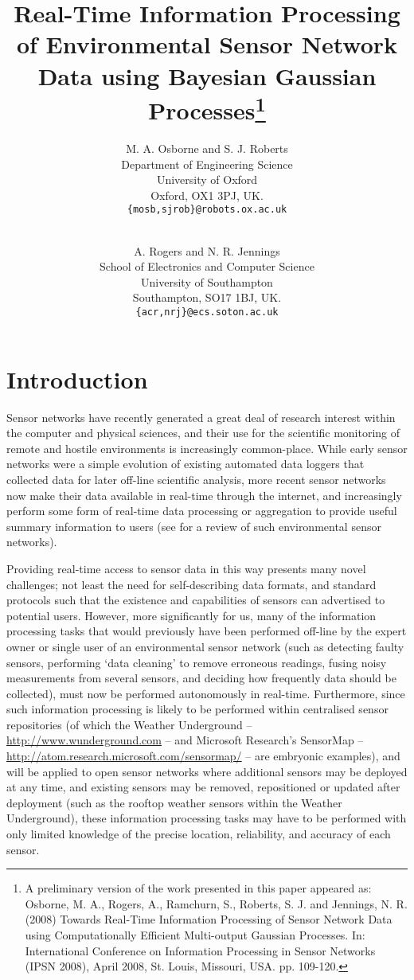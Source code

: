 \documentclass{acmtrans2m}
\title{Real-Time Information Processing of Environmental Sensor Network Data using Bayesian Gaussian Processes\footnote{A preliminary version of the work presented in this paper appeared as: Osborne, M. A., Rogers, A., Ramchurn, S., Roberts, S. J. and Jennings, N. R. (2008) Towards Real-Time Information Processing of Sensor Network Data using Computationally Efficient Multi-output Gaussian Processes. In: International Conference on Information Processing in Sensor Networks (IPSN 2008), April 2008, St. Louis, Missouri, USA. pp. 109-120.}}
\author{M. A. Osborne and S. J. Roberts\\
Department of Engineering Science\\
University of Oxford\\
Oxford, OX1 3PJ, UK.\\
{\tt{\{mosb,sjrob\}@robots.ox.ac.uk}}\\
\and\\
A. Rogers and N. R. Jennings\\
School of Electronics and Computer Science\\
University of Southampton\\
Southampton, SO17 1BJ, UK.\\
{\tt{\{acr,nrj\}@ecs.soton.ac.uk}}\\
}
\begin{document}
\maketitle

\section{Introduction}

\noindent Sensor networks have recently generated a great deal of research interest within the computer and physical sciences, and their use for the scientific monitoring of remote and hostile environments is increasingly common-place. While early sensor networks were a simple evolution of existing automated data loggers that collected data for later off-line scientific analysis, more recent sensor networks now make their data available in real-time through the internet, and increasingly perform some form of real-time data processing or aggregation to provide useful summary information to users (see \cite{esn} for a review of such environmental sensor networks).

Providing real-time access to sensor data in this way presents many novel challenges; not least the need for self-describing data formats, and standard protocols such that the existence and capabilities of sensors can advertised to potential users. However, more significantly for us, many of the information processing tasks that would previously have been performed off-line by the expert owner or single user of an environmental sensor network (such as detecting faulty sensors, performing `data cleaning' to remove erroneous readings, fusing noisy measurements from several sensors, and deciding how frequently data should be collected), must now be performed autonomously in real-time. Furthermore, since such information processing is likely to be performed within centralised sensor repositories (of which the Weather Underground -- \url{http://www.wunderground.com} -- and Microsoft Research's SensorMap -- \url{http://atom.research.microsoft.com/sensormap/} -- are embryonic examples), and will be applied to open sensor networks where additional sensors may be deployed at any time, and existing sensors may be removed, repositioned or updated after deployment (such as the rooftop weather sensors within the Weather Underground), these information processing tasks may have to be performed with only limited knowledge of the precise location, reliability, and accuracy of each sensor.
\end{document}
